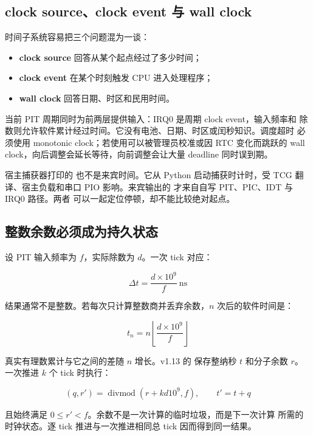 \subsection{clock source、clock event 与 wall clock}

时间子系统容易把三个问题混为一谈：

\begin{itemize}
  \item \textbf{clock source} 回答从某个起点经过了多少时间；
  \item \textbf{clock event} 在某个时刻触发 CPU 进入处理程序；
  \item \textbf{wall clock} 回答日期、时区和民用时间。
\end{itemize}

当前 PIT 周期同时为前两层提供输入：IRQ0 是周期 clock event，输入频率和
除数则允许软件累计经过时间。它没有电池、日期、时区或闰秒知识。调度超时
必须使用 monotonic clock；若使用可以被管理员校准或因 RTC 变化而跳跃的
wall clock，向后调整会延长等待，向前调整会让大量 deadline 同时误到期。

宿主捕获器打印的 \code{[QEMU][T+...ms]} 也不是来宾时间。它从 Python
启动捕获时计时，受 TCG 翻译、宿主负载和串口 PIO 影响。来宾输出的
 才来自自写 PIT、PIC、IDT 与 IRQ0 路径。两者
可以一起定位停顿，却不能比较绝对起点。

\subsection{整数余数必须成为持久状态}

设 PIT 输入频率为 \(f\)，实际除数为 \(d\)。一次 tick 对应：

\[
\Delta t=\frac{d\times 10^9}{f}\ \mathrm{ns}
\]

结果通常不是整数。若每次只计算整数商并丢弃余数，\(n\) 次后的软件时间是：

\[
t_n=n\left\lfloor\frac{d\times 10^9}{f}\right\rfloor
\]

真实有理数累计与它之间的差随 \(n\) 增长。v1.13 的
 保存整纳秒 \(t\) 和分子余数 \(r\)。一次推进 \(k\)
个 tick 时执行：

\[
(q,r')=\operatorname{divmod}(r+k d 10^9,f),\qquad t'=t+q
\]

且始终满足 \(0\le r'<f\)。余数不是一次计算的临时垃圾，而是下一次计算
所需的时钟状态。逐 tick 推进与一次推进相同总 tick 因而得到同一结果。


